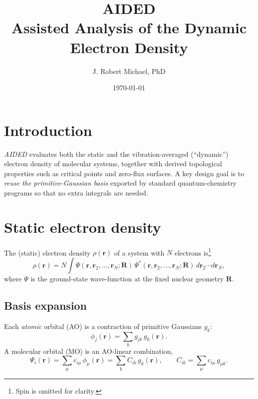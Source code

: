 \documentclass{article}
\title{\textbf{AIDED}\\\large Assisted Analysis of the Dynamic Electron Density}
\author{J. Robert Michael, PhD}
\date{\today}
\begin{document}
\maketitle
\tableofcontents

\section{Introduction}

\emph{AIDED} evaluates both the static and the vibration-averaged
(“dynamic”) electron density of molecular systems, together with derived
topological properties such as critical points and zero-flux surfaces.  A
key design goal is to \emph{reuse the primitive-Gaussian basis} exported by
standard quantum-chemistry programs so that no extra integrals are needed.

\bigskip

\section{Static electron density}
\label{sec:static}

The (static) electron density $\rho(\bm r)$ of a system with $N$
electrons is\footnote{Spin is omitted for clarity.}
\[
  \rho(\bm r)=
  N\int
    \Psi(\bm r,\bm r_2,\dots,\bm r_N;\bm R)\,
    \Psi^{*}(\bm r,\bm r_2,\dots,\bm r_N;\bm R)\,
    d\bm r_2\cdots d\bm r_N ,
\]
where $\Psi$ is the ground-state wave-function at the fixed nuclear
geometry $\bm R$.

\subsection{Basis expansion}

Each \emph{atomic} orbital (AO) is a contraction of primitive Gaussians
$g_k$:
\begin{equation}\label{eq:phi_j}
  \phi_j(\bm r)=\sum_{k} g_{jk}\,g_k(\bm r).
\end{equation}
A molecular orbital (MO) is an AO-linear combination,
\begin{equation}\label{eq:Psi_i}
  \Psi_i(\bm r)=\sum_{\mu} c_{i\mu}\,\phi_\mu(\bm r)
              =\sum_{k} C_{ik}\,g_k(\bm r),
  \qquad C_{ik}=\sum_{\mu}c_{i\mu}\,g_{\mu k}.
\end{equation}
\end{document}
